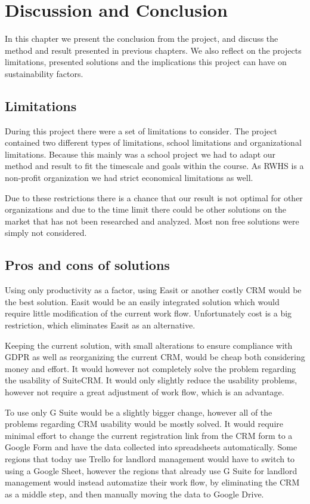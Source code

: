 \section{Discussion and Conclusion}
\label{sec:discussion}
In this chapter we present the conclusion from the project, and discuss the method and result presented in previous chapters. We also reflect on  the projects limitations, presented solutions and the implications this project can have on sustainability factors. 

\subsection{Limitations}
During this project there were a set of limitations to consider. The project contained two different types of limitations, school limitations and organizational limitations. Because this mainly was a school project we had to adapt our method and result to fit the timescale and goals within the course. As RWHS is a non-profit organization we had strict economical limitations as well.

Due to these restrictions there is a chance that our result is not optimal for other organizations and due to the time limit there could be other solutions on the market that has not been researched and analyzed. Most non free solutions were simply not considered.

\subsection{Pros and cons of solutions}
Using only productivity as a factor, using Easit or another costly CRM would be the best solution. Easit would be an easily integrated solution which would require little modification of the current work flow. Unfortunately cost is a big restriction, which eliminates Easit as an alternative.

Keeping the current solution, with small alterations to ensure compliance with GDPR as well as reorganizing the current CRM, would be cheap both considering money and effort. It would however not completely solve the problem regarding the usability of SuiteCRM. It would only slightly reduce the usability problems, however not require a great adjustment of work flow, which is an advantage.

To use only G Suite would be a slightly bigger change, however all of the problems regarding CRM usability would be mostly solved. It would require minimal effort to change the current registration link from the CRM form to a Google Form and have the data collected into spreadsheets automatically. Some regions that today use Trello for landlord management would have to switch to using a Google Sheet, however the regions that already use G Suite for landlord management would instead automatize their work flow, by eliminating the CRM as a middle step, and then manually moving the data to Google Drive.

